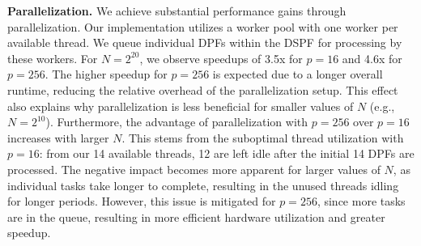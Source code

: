 \textbf{Parallelization.} We achieve substantial performance gains through parallelization. Our implementation utilizes a worker pool with one worker per available thread. We queue individual DPFs within the DSPF for processing by these workers. For $N=2^{20}$, we observe speedups of 3.5x for $p=16$ and 4.6x for $p=256$. The higher speedup for $p=256$ is expected due to a longer overall runtime, reducing the relative overhead of the parallelization setup. This effect also explains why parallelization is less beneficial for smaller values of $N$ (e.g., $N=2^{10}$). Furthermore, the advantage of parallelization with $p=256$ over $p=16$ increases with larger $N$. This stems from the suboptimal thread utilization with $p=16$: from our 14 available threads, 12 are left idle after the initial 14 DPFs are processed. The negative impact becomes more apparent for larger values of $N$, as individual tasks take longer to complete, resulting in the unused threads idling for longer periods. However, this issue is mitigated for $p=256$, since more tasks are in the queue, resulting in more efficient hardware utilization and greater speedup.

